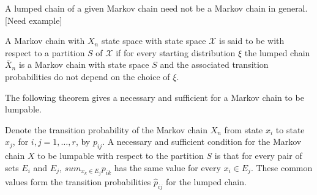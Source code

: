 \documentclass[12pt]{article}
\begin{document}
A lumped chain of a given Markov chain need not be a Markov chain in
general. [Need example]

\begin{definition}
  A Markov chain with $X_n$ state space with state space $\mathcal{X}$
  is said to be  with respect to a partition $S$ of
  $\mathcal{X}$ if for every starting distribution \( \xi \) the lumped chain \(
  \bar{X}_n \) is a Markov chain with state space $S$ and the
  associated transition probabilities do not depend on the choice of
  $\xi$.  
\end{definition}

The following theorem gives a necessary and sufficient for a Markov
chain to be lumpable.

\begin{theorem}
Denote the transition probability
of the Markov chain $X_n$ from state $x_i$ to state $x_j$, for \( i, j
= 1, \dots,  r\), by \( p_{ij} \).  A 
necessary and sufficient condition for the Markov chain $X$ to be lumpable
with respect to the partition $S$ is that for every pair of sets
$E_i$ and $E_j$, \( sum_{x_k \in E_j} p_{ik} \) has the
same value for every \(x_i \in E_j \). These common values form
the transition probabilities $\hat{p}_{ij}$ for the lumped chain.
\end{theorem}
\end{document}
